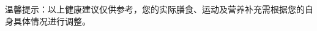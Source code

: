 \begin{center}
\begin{tabular}{|K{2.92cm}K{12.0cm}|}
\end{tabular}
\end{center}

{\noindent\qihao *温馨提示：以上健康建议仅供参考，您的实际膳食、运动及营养补充需根据您的自身具体情况进行调整。}
\vspace*{1cm}


